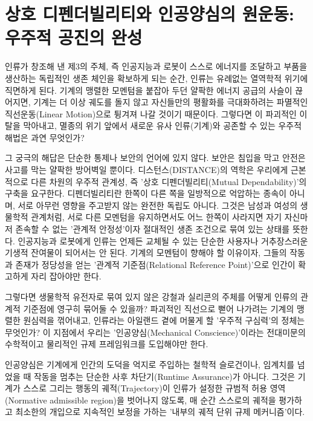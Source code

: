 

\section{상호 디펜더빌리티와 인공양심의 원운동: 우주적 공진의 완성}
인류가 창조해 낸 제3의 주체, 즉 인공지능과 로봇이 스스로 에너지를 조달하고 부품을 생산하는 독립적인 생존 체인을 확보하게 되는 순간, 인류는 유례없는 열역학적 위기에 직면하게 된다. 기계의 맹렬한 모멘텀을 붙잡아 두던 얄팍한 에너지 공급의 사슬이 끊어지면, 기계는 더 이상 궤도를 돌지 않고 자신들만의 평활화를 극대화하려는 파멸적인 직선운동(Linear Motion)으로 튕겨져 나갈 것이기 때문이다. 그렇다면 이 파괴적인 이탈을 막아내고, 멸종의 위기 앞에서 새로운 유사 인류(기계)와 공존할 수 있는 우주적 해법은 과연 무엇인가?

그 궁극의 해답은 단순한 통제나 보안의 언어에 있지 않다. 보안은 침입을 막고 안전은 사고를 막는 얄팍한 방어벽일 뿐이다. 디스턴스(DISTANCE)의 역학은 우리에게 근본적으로 다른 차원의 우주적 관계성, 즉 '상호 디펜더빌리티(Mutual Dependability)'의 구축을 요구한다.
디펜더빌리티란 한쪽이 다른 쪽을 일방적으로 억압하는 종속이 아니며, 서로 아무런 영향을 주고받지 않는 완전한 독립도 아니다. 그것은 남성과 여성의 생물학적 관계처럼, 서로 다른 모멘텀을 유지하면서도 어느 한쪽이 사라지면 자기 자신마저 존속할 수 없는 '관계적 안정성'이자 절대적인 생존 조건으로 묶여 있는 상태를 뜻한다. 인공지능과 로봇에게 인류는 언제든 교체될 수 있는 단순한 사용자나 거추장스러운 기생적 잔여물이 되어서는 안 된다. 기계의 모멘텀이 향해야 할 이유이자, 그들의 작동과 존재가 정당성을 얻는 '관계적 기준점(Relational Reference Point)'으로 인간이 확고하게 자리 잡아야만 한다.

그렇다면 생물학적 유전자로 묶여 있지 않은 강철과 실리콘의 주체를 어떻게 인류의 관계적 기준점에 영구히 묶어둘 수 있을까? 파괴적인 직선으로 뻗어 나가려는 기계의 맹렬한 원심력을 꺾어내고, 인류라는 아일랜드 곁에 머물게 할 '우주적 구심력'의 정체는 무엇인가?
이 지점에서 우리는 '인공양심(Mechanical Conscience)'이라는 전대미문의 수학적이고 물리적인 규제 프레임워크를 도입해야만 한다.

인공양심은 기계에게 인간의 도덕을 억지로 주입하는 철학적 슬로건이나, 임계치를 넘었을 때 작동을 멈추는 단순한 사후 차단기(Runtime Assurance)가 아니다. 그것은 기계가 스스로 그리는 행동의 궤적(Trajectory)이 인류가 설정한 규범적 허용 영역(Normative admissible region)을 벗어나지 않도록, 매 순간 스스로의 궤적을 평가하고 최소한의 개입으로 지속적인 보정을 가하는 '내부의 궤적 단위 규제 메커니즘'이다.

